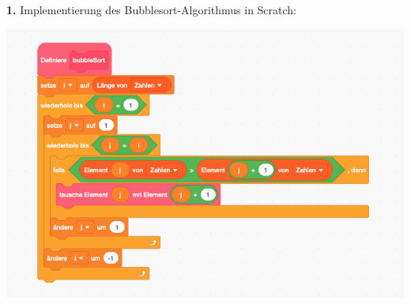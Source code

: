 \documentclass[11pt, a4paper]{arbeitsblatt}
\begin{document}
\ReiheTitel

\begin{wrapfix}
\begin{figure}
\end{figure}
\textcolor{secondary}{\bfseries 1.} Implementierung des Bubblesort-Algorithmus in Scratch:

\begin{center}
	\includegraphics[width=.8\linewidth]{EF-AB.IV.4-Loesung_Bubblesort.png}
\end{center}
\end{wrapfix}
\end{document}

